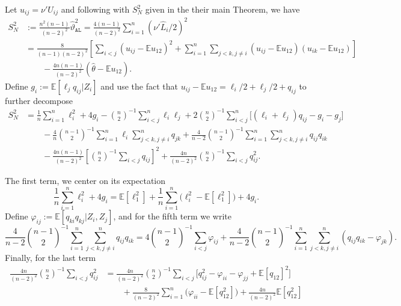 \documentclass[11pt]{article}
\numberwithin{equation}{section}
\theoremstyle{definition}
\newcommand{\E}{\mathbb{E}}
\newcommand{\Scale}{\vartheta}
\begin{document}
Let $u_{ij}= \nu'U_{ij}$ and following \citet{Callaert-Veraverbeke_1981_AOS} with $S_N^2$ given in the their main Theorem, we have
\begin{align*}
    S_N^2
    &:= \frac{n^2(n-1)}{(n-2)^2}\widehat{\Scale}_\mathtt{AL}^2 
    = \frac{4(n-1)}{(n-2)^2} \sum_{i=1}^n (\nu'\widehat{L}_i/2)^2\\
    &= \frac{8}{(n-1)(n-2)^2}\left[\sum_{i<j} (u_{ij}-\E u_{12})^2 +\sum_{i=1}^n\sum_{j<k,j\neq i} (u_{ij}-\E u_{12})(u_{ik}-\E u_{12})\right]\\
    &\qquad -\frac{4n(n-1)}{(n-2)^2}(\widehat{\theta} - \E u_{12}).
\end{align*}
Define $g_i := \E[\ell_j q_{ij}|Z_i]$ and use the fact that $u_{ij}-\E u_{12} = \ell_i/2 + \ell_j/2 + q_{ij}$ to further decompose
\begin{align}\label{E:AL_decomp}
    S_N^2 &= \frac{1}{n}\sum_{i=1}^n\ell_i^2 + 4 g_i
            - \binom{n}{2}^{-1}\sum_{i<j}^n\ell_i\ell_j
            + 2\binom{n}{2}^{-1}\sum_{i<j}^n\big[(\ell_i + \ell_j)q_{ij} - g_i - g_j\big]\nonumber\\
    &\qquad -\frac{4}{n}\binom{n-1}{2}^{-1}\sum_{i=1}^n\ell_i\sum_{j<k, j\neq i}^nq_{jk}
            + \frac{4}{n-2}\binom{n-1}{2}^{-1}\sum_{i=1}^n\sum_{j<k, j\neq i}^nq_{ij}q_{ik}\nonumber\\
    &\qquad - \frac{4n(n-1)}{(n-2)^2}\left[\binom{n}{2}^{-1}\sum_{i<j} q_{ij}\right]^2
            + \frac{4n}{(n-2)^2}\binom{n}{2}^{-1}\sum_{i<j} q_{ij}^2.
\end{align}

The first term, we center on its expectation
\[\frac{1}{n}\sum_{i=1}^n\ell_i^2 + 4 g_i = \E[\ell_1^2] + \frac{1}{n}\sum_{i=1}^n\big(\ell_i^2 - \E[\ell_1^2]\big) + 4 g_i.\]
Define $\varphi_{ij}:=\E[ q_{ki}q_{kj}|Z_i,Z_j]$, and for the fifth term we write
\begin{equation*}
    \frac{4}{n-2}\binom{n-1}{2}^{-1}\sum_{i=1}^n\sum_{j<k, j\neq i}^nq_{ij}q_{ik}= 4\binom{n-1}{2}^{-1}\sum_{i<j}\varphi_{ij} + \frac{4}{n-2}\binom{n-1}{2}^{-1}\sum_{i=1}^n\sum_{j<k, j\neq i}^n(q_{ij}q_{ik}-\varphi_{jk}).
\end{equation*}
Finally, for the last term
\begin{align*}
\frac{4n}{(n-2)^2}\binom{n}{2}^{-1}\sum_{i<j} q_{ij}^2&= \frac{4n}{(n-2)^2}\binom{n}{2}^{-1}\sum_{i<j} \big[q_{ij}^2 - \varphi_{ii} - \varphi_{jj} + \E[q_{12}]^2]\\
&\qquad + \frac{8}{(n-2)^2}\sum_{i=1}^n \big(\varphi_{ii}-\E[q_{12}^2]\big) + \frac{4n}{(n-2)^2}\E[q_{12}^2]
\end{align*}
\end{document}
